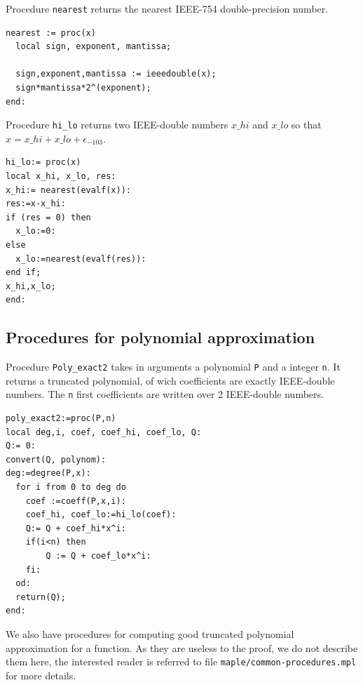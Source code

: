 Procedure \texttt{nearest} returns the nearest IEEE-754
double-precision number.

\begin{lstlisting}[caption={nearest},firstnumber=1]
nearest := proc(x)
  local sign, exponent, mantissa;

  sign,exponent,mantissa := ieeedouble(x);
  sign*mantissa*2^(exponent);
end:
\end{lstlisting}



Procedure \texttt{hi\_lo} returns two IEEE-double numbers $x\_hi$ and
$x\_lo$ so that $x = x\_hi + x\_lo + \epsilon_{-103}$.

\begin{lstlisting}[caption={hi\_lo},firstnumber=1]
hi_lo:= proc(x)
local x_hi, x_lo, res:
x_hi:= nearest(evalf(x)):
res:=x-x_hi:
if (res = 0) then
  x_lo:=0:
else
  x_lo:=nearest(evalf(res)):
end if;
x_hi,x_lo;
end:
\end{lstlisting}
\vspace{0.5cm}




\subsection{Procedures for polynomial approximation}


Procedure \texttt{Poly\_exact2} takes in arguments a polynomial
\texttt{P} and a integer \texttt{n}. It returns a truncated
polynomial, of wich coefficients are exactly IEEE-double numbers. The
\texttt{n} first coefficients are written over 2 IEEE-double numbers.

\begin{lstlisting}[caption={poly\_exact2},firstnumber=1]
poly_exact2:=proc(P,n)
local deg,i, coef, coef_hi, coef_lo, Q:
Q:= 0:
convert(Q, polynom):
deg:=degree(P,x):
  for i from 0 to deg do
    coef :=coeff(P,x,i):
    coef_hi, coef_lo:=hi_lo(coef):
    Q:= Q + coef_hi*x^i:
    if(i<n) then
        Q := Q + coef_lo*x^i:
    fi:
  od:
  return(Q);
end:
\end{lstlisting}
\vspace{0.5cm}


We also have procedures for computing good truncated polynomial
approximation for a function. As they are useless to the proof, we do
not describe them here, the interested reader is referred to file
\texttt{maple/common-procedures.mpl} for more details.










